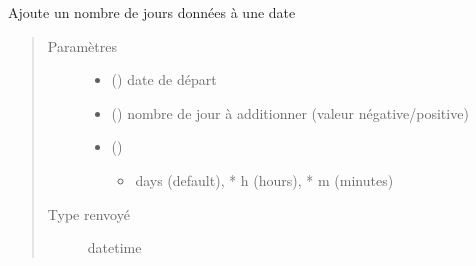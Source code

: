 \documentclass[letterpaper,10pt,french]{sphinxmanual}
\begin{document}

\begin{fulllineitems}
\label{\detokenize{modules/dtemng:toolbox.dtemng.dateadd}}
Ajoute un nombre de jours données à une date
\begin{quote}\begin{description}
\item[{Paramètres}] \leavevmode\begin{itemize}
\item {} 
 () \textendash{} date de départ

\item {} 
 () \textendash{} nombre de jour à additionner (valeur négative/positive)

\item {} 
 () \textendash{} \begin{itemize}
\item {} 
days (default), * h (hours), * m (minutes)

\end{itemize}


\end{itemize}

\item[{Type renvoyé}] \leavevmode
datetime

\end{description}\end{quote}

\end{fulllineitems}

\end{document}
